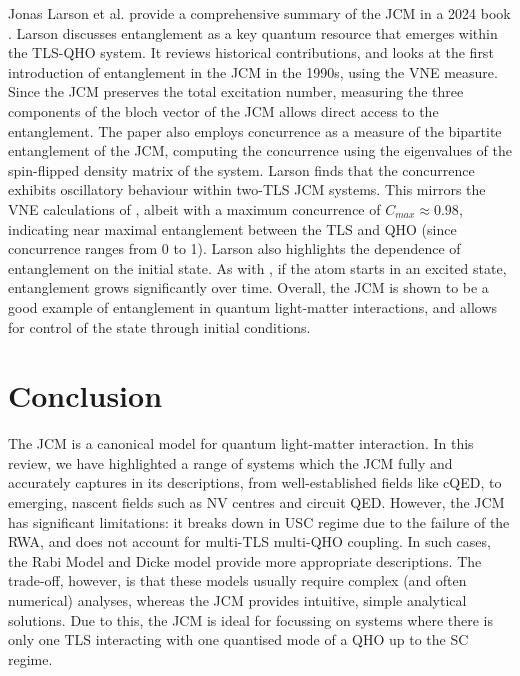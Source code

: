 \documentclass[12pt,a4paper]{article}
\begin{document}

Jonas Larson et al. provide a comprehensive summary of the JCM in a 2024 book \cite{General2024-JC_overview}. Larson discusses entanglement as a key quantum resource that emerges within the TLS-QHO system. It reviews historical contributions, and looks at the first introduction of entanglement in the JCM in the 1990s, using the VNE measure. Since the JCM preserves the total excitation number, measuring the three components of the bloch vector of the JCM allows direct access to the entanglement. The paper also employs concurrence as a measure of the bipartite entanglement of the JCM, computing the concurrence using the eigenvalues of the spin-flipped density matrix of the system. Larson finds that the concurrence exhibits oscillatory behaviour within two-TLS JCM systems. This mirrors the VNE calculations of \cite{Entanglement2009-REE_VNapplied}, albeit with a maximum concurrence of $C_{max}\approx0.98$, indicating near maximal entanglement between the TLS and QHO (since concurrence ranges from 0 to 1). Larson also highlights the dependence of entanglement on the initial state. As with \cite{Entanglement2009-REE_VNapplied}, if the atom starts in an excited state, entanglement grows significantly over time. Overall, the JCM is shown to be a good example of entanglement in quantum light-matter interactions, and allows for control of the state through initial conditions. 

\newpage

\section{Conclusion} \label{sec_Conclusion}

The JCM is a canonical model for quantum light-matter interaction. In this review, we have highlighted a range of systems which the JCM fully and accurately captures in its descriptions, from well-established fields like cQED, to emerging, nascent fields such as NV centres and circuit QED. However, the JCM has significant limitations: it breaks down in USC regime due to the failure of the RWA, and does not account for multi-TLS multi-QHO coupling. In such cases, the Rabi Model and Dicke model provide more appropriate descriptions. The trade-off, however, is that these models usually require complex (and often numerical) analyses, whereas the JCM provides intuitive, simple analytical solutions. Due to this, the JCM is ideal for focussing on systems where there is only one TLS interacting with one quantised mode of a QHO up to the SC regime. 
\end{document}
